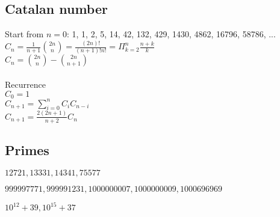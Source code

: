 \subsection{Catalan number}

\begin{center}
Start from \(n = 0\): 1, 1, 2, 5, 14, 42, 132, 429, 1430, 4862, 16796, 58786, ... \\
\(C_n = \frac{1}{n + 1} \binom{2n}{n} = \frac{(2n)!}{(n + 1)! n!} = \Pi_{k = 2}^n \frac{n + k}{k}\) \\
\(C_n = \binom{2n}{n} - \binom{2n}{n + 1}\) \\
\\
Recurrence \\
\(C_0 = 1\) \\
\(C_{n + 1} = \sum_{i = 0}^n C_i C_{n - i}\) \\
\(C_{n + 1} = \frac{2(2n + 1)}{n + 2} C_n\) \\
\end{center}

\subsection{Primes}
$12721, 13331, 14341, 75577$

$999997771, 999991231, 1000000007, 1000000009, 1000696969$

$10^{12} + 39, 10^{15} + 37$